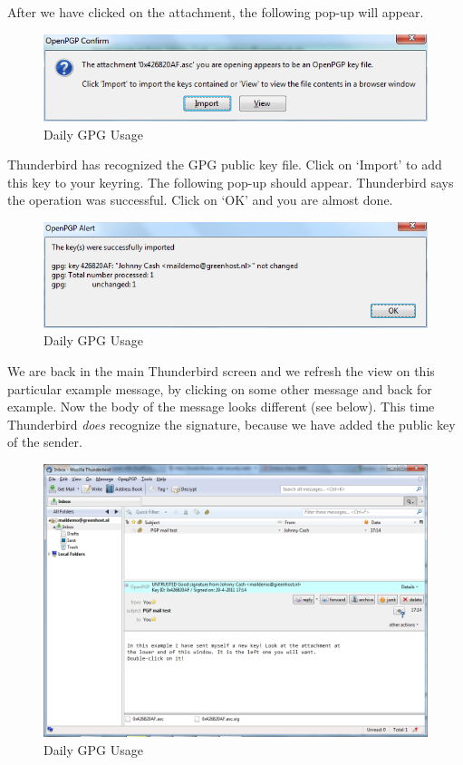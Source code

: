 After we have clicked on the attachment, the following pop-up will
appear.

\begin{figure}[htbp]
\centering
\includegraphics{daily_gpg_5.png}
\caption{Daily GPG Usage}
\end{figure}

Thunderbird has recognized the GPG public key file. Click on `Import' to
add this key to your keyring. The following pop-up should appear.
Thunderbird says the operation was successful. Click on `OK' and you are
almost done.

\begin{figure}[htbp]
\centering
\includegraphics{daily_gpg_6.png}
\caption{Daily GPG Usage}
\end{figure}

We are back in the main Thunderbird screen and we refresh the view on
this particular example message, by clicking on some other message and
back for example. Now the body of the message looks different (see
below). This time Thunderbird \emph{does} recognize the signature,
because we have added the public key of the sender.

\begin{figure}[htbp]
\centering
\includegraphics{daily_gpg_7.png}
\caption{Daily GPG Usage}
\end{figure}

